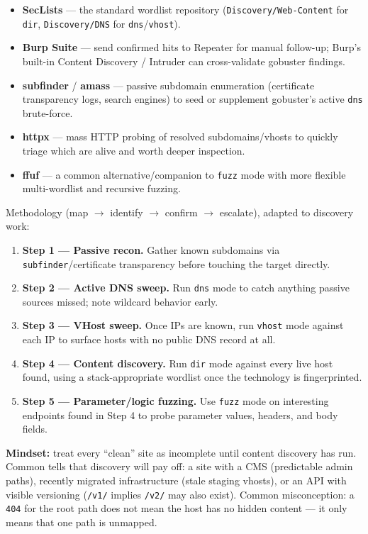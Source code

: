 \documentclass[11pt]{article}
\begin{document}
\begin{itemize}
    \item \textbf{SecLists} --- the standard wordlist repository (\texttt{Discovery/Web-Content} for \texttt{dir}, \texttt{Discovery/DNS} for \texttt{dns}/\texttt{vhost}).
    \item \textbf{Burp Suite} --- send confirmed hits to Repeater for manual follow-up; Burp's built-in Content Discovery / Intruder can cross-validate gobuster findings.
    \item \textbf{subfinder} / \textbf{amass} --- passive subdomain enumeration (certificate transparency logs, search engines) to seed or supplement gobuster's active \texttt{dns} brute-force.
    \item \textbf{httpx} --- mass HTTP probing of resolved subdomains/vhosts to quickly triage which are alive and worth deeper inspection.
    \item \textbf{ffuf} --- a common alternative/companion to \texttt{fuzz} mode with more flexible multi-wordlist and recursive fuzzing.
\end{itemize}

Methodology (map $\rightarrow$ identify $\rightarrow$ confirm $\rightarrow$ escalate), adapted to discovery work:
\begin{enumerate}
    \item \textbf{Step 1 --- Passive recon.} Gather known subdomains via \texttt{subfinder}/certificate transparency before touching the target directly.
    \item \textbf{Step 2 --- Active DNS sweep.} Run \texttt{dns} mode to catch anything passive sources missed; note wildcard behavior early.
    \item \textbf{Step 3 --- VHost sweep.} Once IPs are known, run \texttt{vhost} mode against each IP to surface hosts with no public DNS record at all.
    \item \textbf{Step 4 --- Content discovery.} Run \texttt{dir} mode against every live host found, using a stack-appropriate wordlist once the technology is fingerprinted.
    \item \textbf{Step 5 --- Parameter/logic fuzzing.} Use \texttt{fuzz} mode on interesting endpoints found in Step 4 to probe parameter values, headers, and body fields.
\end{enumerate}

\textbf{Mindset:} treat every ``clean'' site as incomplete until content discovery has run. Common tells that discovery will pay off: a site with a CMS (predictable admin paths), recently migrated infrastructure (stale staging vhosts), or an API with visible versioning (\texttt{/v1/} implies \texttt{/v2/} may also exist). Common misconception: a \texttt{404} for the root path does not mean the host has no hidden content --- it only means that one path is unmapped.
\end{document}
